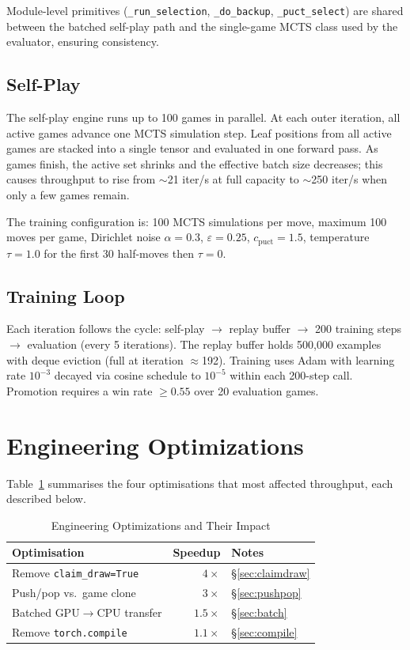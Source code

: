 \documentclass[conference]{IEEEtran}
\begin{document}
Module-level primitives (\texttt{\_run\_selection}, \texttt{\_do\_backup},
\texttt{\_puct\_select}) are shared between the batched self-play path and the
single-game MCTS class used by the evaluator, ensuring consistency.

\subsection{Self-Play}

The self-play engine runs up to 100 games in parallel. At each outer iteration,
all active games advance one MCTS simulation step. Leaf positions from all
active games are stacked into a single tensor and evaluated in one forward
pass. As games finish, the active set shrinks and the effective batch size
decreases; this causes throughput to rise from $\sim$21 iter/s at full
capacity to $\sim$250 iter/s when only a few games remain.

The training configuration is: 100 MCTS simulations per move, maximum 100
moves per game, Dirichlet noise $\alpha=0.3$, $\varepsilon=0.25$,
$c_\text{puct}=1.5$, temperature $\tau=1.0$ for the first 30 half-moves then
$\tau=0$.

\subsection{Training Loop}

Each iteration follows the cycle: self-play $\to$ replay buffer $\to$ 200
training steps $\to$ evaluation (every 5 iterations). The replay buffer holds
500,000 examples with deque eviction (full at iteration $\approx$192).
Training uses Adam with learning rate $10^{-3}$ decayed via cosine schedule to
$10^{-5}$ within each 200-step call. Promotion requires a win rate $\geq 0.55$
over 20 evaluation games.

\section{Engineering Optimizations}

Table~\ref{tab:opt} summarises the four optimisations that most affected
throughput, each described below.

\begin{table}[t]
\caption{Engineering Optimizations and Their Impact}
\label{tab:opt}
\centering
\begin{tabular}{lrl}
\toprule
Optimisation & Speedup & Notes \\
\midrule
Remove \texttt{claim\_draw=True}   & $4\times$   & \S\ref{sec:claimdraw} \\
Push/pop vs.\ game clone           & $3\times$   & \S\ref{sec:pushpop}   \\
Batched GPU$\to$CPU transfer       & $1.5\times$ & \S\ref{sec:batch}     \\
Remove \texttt{torch.compile}      & $1.1\times$ & \S\ref{sec:compile}   \\
\bottomrule
\end{tabular}
\end{table}
\end{document}

